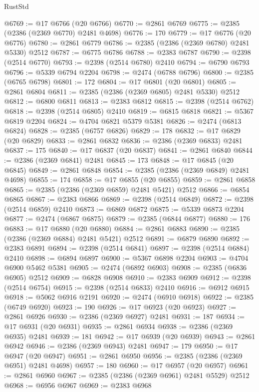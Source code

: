 \begin{lexlean}{RustStd}
\begin{coremodule}
{\begin{coremodule}
{{{{{{{{{{{{{{{{{{{{{{{{{{{{{{{{{{{{{{{{{{{{{{{{{{@6769 := @17 @6766 (@20 @6766)
@6770 := @2861 @6769
@6775 := @2385 (@2386 (@2369 @6770) @2481 @4698)
@6776 := 170
@6779 := @17 @6776 (@20 @6776)
@6780 := @2861 @6779
@6786 := @2385 (@2386 (@2369 @6780) @2481 @5330) @2512
@6787 := @6775 @6786
@6788 := @2383 @6787
@6790 := @2398 (@2514 @6770)
@6793 := @2398 (@2514 @6780) @2410
@6794 := @6790 @6793
@6796 := @5339 @6794 @2204
@6798 := @2474 (@6788 @6796)
@6800 := @2385 (@6765 @6798)
@6801 := 172
@6804 := @17 @6801 (@20 @6801)
@6805 := @2861 @6804
@6811 := @2385 (@2386 (@2369 @6805) @2481 @5330) @2512
@6812 := @6800 @6811
@6813 := @2383 @6812
@6815 := @2398 (@2514 @6762)
@6818 := @2398 (@2514 @6805) @2410
@6819 := @6815 @6818
@6821 := @5367 @6819 @2204
@6824 := @4704 @6821 @5379 @5381
@6826 := @2474 (@6813 @6824)
@6828 := @2385 (@6757 @6826)
@6829 := 178
@6832 := @17 @6829 (@20 @6829)
@6833 := @2861 @6832
@6836 := @2386 (@2369 @6833) @2481
@6837 := 175
@6840 := @17 @6837 (@20 @6837)
@6841 := @2861 @6840
@6844 := @2386 (@2369 @6841) @2481
@6845 := 173
@6848 := @17 @6845 (@20 @6845)
@6849 := @2861 @6848
@6854 := @2385 (@2386 (@2369 @6849) @2481 @4698)
@6855 := 174
@6858 := @17 @6855 (@20 @6855)
@6859 := @2861 @6858
@6865 := @2385 (@2386 (@2369 @6859) @2481 @5421) @2512
@6866 := @6854 @6865
@6867 := @2383 @6866
@6869 := @2398 (@2514 @6849)
@6872 := @2398 (@2514 @6859) @2410
@6873 := @6869 @6872
@6875 := @5339 @6873 @2204
@6877 := @2474 (@6867 @6875)
@6879 := @2385 (@6844 @6877)
@6880 := 176
@6883 := @17 @6880 (@20 @6880)
@6884 := @2861 @6883
@6890 := @2385 (@2386 (@2369 @6884) @2481 @5421) @2512
@6891 := @6879 @6890
@6892 := @2383 @6891
@6894 := @2398 (@2514 @6841)
@6897 := @2398 (@2514 @6884) @2410
@6898 := @6894 @6897
@6900 := @5367 @6898 @2204
@6903 := @4704 @6900 @5462 @5381
@6905 := @2474 (@6892 @6903)
@6908 := @2385 (@6836 @6905) @2512
@6909 := @6828 @6908
@6910 := @2383 @6909
@6912 := @2398 (@2514 @6754)
@6915 := @2398 (@2514 @6833) @2410
@6916 := @6912 @6915
@6918 := @5062 @6916 @2191
@6920 := @2474 (@6910 @6918)
@6922 := @2385 (@6749 @6920)
@6923 := 190
@6926 := @17 @6923 (@20 @6923)
@6927 := @2861 @6926
@6930 := @2386 (@2369 @6927) @2481
@6931 := 187
@6934 := @17 @6931 (@20 @6931)
@6935 := @2861 @6934
@6938 := @2386 (@2369 @6935) @2481
@6939 := 181
@6942 := @17 @6939 (@20 @6939)
@6943 := @2861 @6942
@6946 := @2386 (@2369 @6943) @2481
@6947 := 179
@6950 := @17 @6947 (@20 @6947)
@6951 := @2861 @6950
@6956 := @2385 (@2386 (@2369 @6951) @2481 @4698)
@6957 := 180
@6960 := @17 @6957 (@20 @6957)
@6961 := @2861 @6960
@6967 := @2385 (@2386 (@2369 @6961) @2481 @5529) @2512
@6968 := @6956 @6967
@6969 := @2383 @6968
}}}}}}}}}}}}}}}}}}}}}}}}}}}}}}}}}}}}}}}}}}}}}}}}}}
\end{coremodule}}
\end{coremodule}
\end{lexlean}
